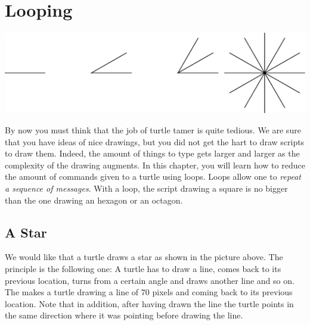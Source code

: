\ifx\wholebook\relax\else



\fi

\chapter{Looping}\label{ch:looping}\label{cha:loops}

\begin{chapterfigure}
\includegraphics[width=0.9\linewidth]{loopTitlePicture}
\end{chapterfigure}



By now you must think that the job of turtle tamer is quite
tedious. We are sure that you have ideas of nice drawings, but you did not get the hart to draw scripts to draw them.  Indeed, the amount of things to type gets larger and larger as the complexity of the drawing augments. In this chapter, you will learn how to reduce the amount of commands given to a turtle using loops. Loops allow one to \emph{repeat a sequence of messages}. With a loop, the script drawing a square is no bigger than the one drawing an hexagon or an octagon.

\section{A Star}
We would like that a turtle draws a star as shown in the picture above. The principle is the following one: A turtle has to draw a line, comes back to its previous location, turns from a certain angle and draws another line and so on. The  makes a turtle drawing a line of 70 pixels
and coming back to its previous location. Note that in addition, after having drawn the line the turtle points in the same direction where it was pointing before drawing the line.

